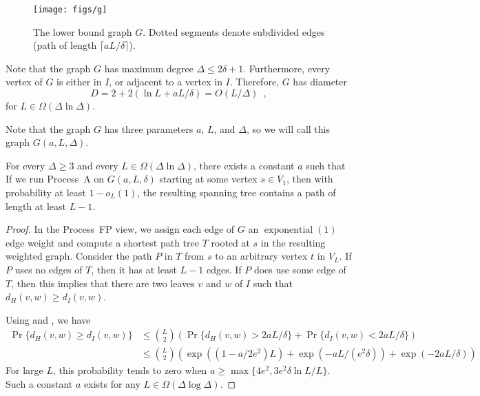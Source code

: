 \documentclass[lotsofwhite]{patmorin}
\DeclareMathOperator{\exponential}{exponential}
\begin{document}
\begin{figure}
  \begin{center}
    \texttt{[image: figs/g]}
  \end{center}
  \caption{The lower bound graph $G$. Dotted segments denote subdivided edges (path of length $\lceil aL/\delta\rceil$).}
\end{figure}

Note that the graph $G$ has maximum degree $\Delta\le 2\delta+1$.
Furthermore, every vertex of $G$ is either in $I$, or adjacent to a
vertex in $I$.  Therefore, $G$ has diameter
\[
    D = 2+2(\ln L + aL/\delta) = O(L/\Delta) \enspace ,
\]
for $L\in\Omega(\Delta\ln\Delta)$.

Note that the graph $G$ has three parameters $a$, $L$, and $\Delta$,
so we will call this graph $G(a,L,\Delta)$.
%
\begin{thm}
  For every $\Delta\ge 3$ and every $L\in\Omega(\Delta\ln\Delta)$, there
  exists a constant $a$ such that If we run Process~A on $G(a,L,\delta)$
  starting at some vertex $s\in V_1$, then with probability at least
  $1-o_L(1)$, the resulting spanning tree contains a path of length at
  least $L-1$.
\end{thm}

\begin{proof}
  In the Process~FP view, we assign each edge of $G$ an $\exponential(1)$
  edge weight and compute a shortest path tree $T$ rooted at $s$ in
  the resulting weighted graph.  Consider the path $P$ in $T$ from $s$
  to an arbitrary vertex $t$ in $V_L$.  If $P$ uses no edges of $T$,
  then it has at least $L-1$ edges.  If $P$ does use some edge of $T$,
  then this implies that there are two leaves $v$ and $w$ of $I$ such
  that $d_H(v,w) \ge d_I(v,w)$.

  Using  and , we have
  \begin{align*}
     \Pr\{d_H(v,w) \ge d_I(v,w)\}
       & \le \binom{L}{2}\left(\Pr\{d_H(v,w) > 2aL/\delta\} + \Pr\{d_I(v,w) < 2aL/\delta\}\right)  \\
       & \le \binom{L}{2}\left(\exp((1-a/2e^2)L) 
                + \exp(-aL/(e^2\delta)) 
                + \exp(-2aL/\delta)
              \right)
  \end{align*}
  For large $L$, this probability tends to zero when $a\ge \max\{4e^2, 3e^2\delta\ln L/L\}$.  Such a constant $a$ exists for any $L\in\Omega(\Delta\log\Delta)$.
\end{proof}
\end{document}
